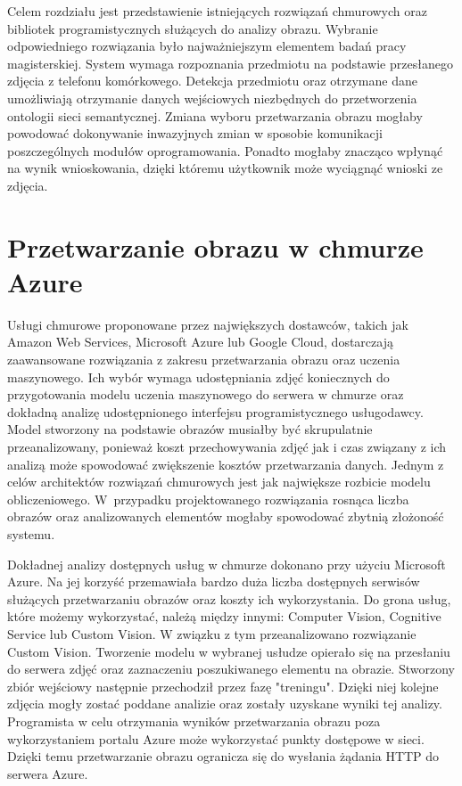 Celem rozdziału jest przedstawienie istniejących rozwiązań chmurowych oraz bibliotek programistycznych służących do analizy obrazu. Wybranie odpowiedniego rozwiązania było najważniejszym elementem badań pracy magisterskiej. System wymaga rozpoznania przedmiotu na podstawie przesłanego zdjęcia z telefonu komórkowego. Detekcja przedmiotu oraz otrzymane dane umożliwiają otrzymanie danych wejściowych niezbędnych do przetworzenia ontologii sieci semantycznej. Zmiana wyboru przetwarzania obrazu mogłaby powodować dokonywanie inwazyjnych zmian w sposobie komunikacji poszczególnych modułów oprogramowania. Ponadto mogłaby znacząco wpłynąć na wynik wnioskowania, dzięki któremu użytkownik może wyciągnąć wnioski ze zdjęcia.

\section{Przetwarzanie obrazu w chmurze Azure} {
Usługi chmurowe proponowane przez największych dostawców, takich jak Amazon Web Services, Microsoft Azure lub Google Cloud, dostarczają zaawansowane rozwiązania z zakresu przetwarzania obrazu oraz uczenia maszynowego. Ich wybór wymaga udostępniania zdjęć koniecznych do przygotowania modelu uczenia maszynowego do serwera w chmurze oraz dokładną analizę udostępnionego interfejsu programistycznego usługodawcy. Model stworzony na podstawie obrazów musiałby być skrupulatnie przeanalizowany, ponieważ koszt przechowywania zdjęć jak i czas związany z ich analizą może spowodować zwiększenie kosztów przetwarzania danych. Jednym z celów architektów rozwiązań chmurowych jest jak największe rozbicie modelu obliczeniowego. W~przypadku projektowanego rozwiązania rosnąca liczba obrazów oraz analizowanych elementów mogłaby spowodować zbytnią złożoność systemu. 

Dokładnej analizy dostępnych usług w chmurze dokonano przy użyciu Microsoft Azure. Na jej korzyść przemawiała bardzo duża liczba dostępnych serwisów służących przetwarzaniu obrazów oraz koszty ich wykorzystania. Do grona usług, które możemy wykorzystać, należą między innymi: Computer Vision, Cognitive Service lub Custom Vision. W związku z tym przeanalizowano rozwiązanie Custom Vision. Tworzenie modelu w wybranej usłudze opierało się na przesłaniu do serwera zdjęć oraz zaznaczeniu poszukiwanego elementu na obrazie. Stworzony zbiór wejściowy następnie przechodził przez fazę "treningu". Dzięki niej kolejne zdjęcia mogły zostać poddane analizie oraz zostały uzyskane wyniki tej analizy. Programista w celu otrzymania wyników przetwarzania obrazu poza wykorzystaniem portalu Azure może wykorzystać punkty dostępowe w sieci. Dzięki temu przetwarzanie obrazu ogranicza się do wysłania żądania HTTP do serwera Azure.

}
